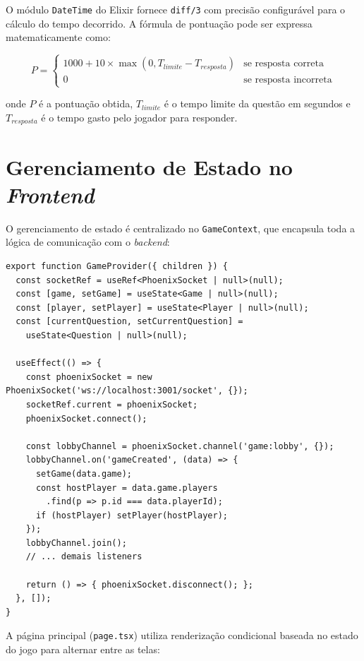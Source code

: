 \documentclass[
	12pt,
	openany,
	oneside,
	a4paper,
	english,
	brazil
]{abntex2}
\begin{document}
O módulo \texttt{DateTime} do Elixir fornece \texttt{diff/3} com precisão configurável para o cálculo do tempo decorrido. A fórmula de pontuação pode ser expressa matematicamente como:

\begin{equation}
P = \begin{cases}
1000 + 10 \times \max(0, T_{limite} - T_{resposta}) & \text{se resposta correta} \\
0 & \text{se resposta incorreta}
\end{cases}
\end{equation}

\noindent onde $P$ é a pontuação obtida, $T_{limite}$ é o tempo limite da questão em segundos e $T_{resposta}$ é o tempo gasto pelo jogador para responder.

\section{Gerenciamento de Estado no \textit{Frontend}}

O gerenciamento de estado é centralizado no \texttt{GameContext}, que encapsula toda a lógica de comunicação com o \textit{backend}:

\begin{lstlisting}[caption={Context API com Phoenix Channels para gerenciamento de estado (trecho de \texttt{GameContext.tsx})}, label={lst:context}]
export function GameProvider({ children }) {
  const socketRef = useRef<PhoenixSocket | null>(null);
  const [game, setGame] = useState<Game | null>(null);
  const [player, setPlayer] = useState<Player | null>(null);
  const [currentQuestion, setCurrentQuestion] =
    useState<Question | null>(null);

  useEffect(() => {
    const phoenixSocket = new PhoenixSocket('ws://localhost:3001/socket', {});
    socketRef.current = phoenixSocket;
    phoenixSocket.connect();

    const lobbyChannel = phoenixSocket.channel('game:lobby', {});
    lobbyChannel.on('gameCreated', (data) => {
      setGame(data.game);
      const hostPlayer = data.game.players
        .find(p => p.id === data.playerId);
      if (hostPlayer) setPlayer(hostPlayer);
    });
    lobbyChannel.join();
    // ... demais listeners

    return () => { phoenixSocket.disconnect(); };
  }, []);
}
\end{lstlisting}

A página principal (\texttt{page.tsx}) utiliza renderização condicional baseada no estado do jogo para alternar entre as telas:
\end{document}
